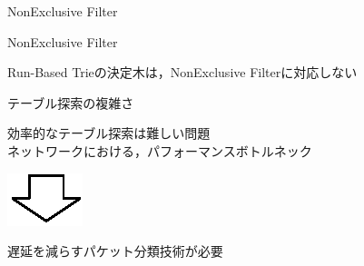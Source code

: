\documentclass[12pt,dvipdfmx,mathserif,uplatex,aspectratio=32]{beamer}
\begin{document}
\begin{frame}{NonExclusive Filter}

{\centering


}

\end{frame}

\begin{frame}{NonExclusive Filter}

{\centering
\scalebox{0.75}{}

}

\vspace{5mm}

{\centering

Run-Based Trieの決定木は，NonExclusive Filterに対応しない
}

\end{frame}

\begin{frame}{テーブル探索の複雑さ}

効率的なテーブル探索は難しい問題 \\
\vspace{3mm}
ネットワークにおける，パフォーマンスボトルネック

\vspace{5mm}
{\centering
\includegraphics{downarrow.eps}

}

\vspace{5mm}

{\centering
遅延を減らすパケット分類技術が必要


}

\end{frame}
\end{document}
